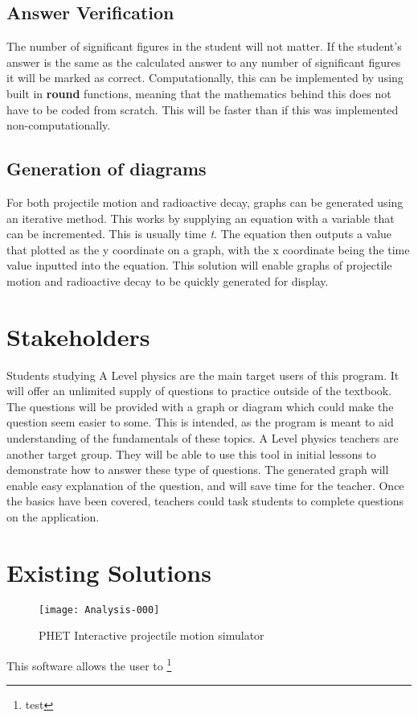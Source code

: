 \subsection{Answer Verification}
The number of significant figures in the student will not matter. If the student's answer is the same as the calculated answer to any number of significant figures it will be marked as correct. Computationally, this can be implemented by using built in \textbf{round} functions, meaning that the mathematics behind this does not have to be coded from scratch. This will be faster than if this was implemented non-computationally.
\subsection{Generation of diagrams}
For both projectile motion and radioactive decay, graphs can be generated using an iterative method. This works by supplying an equation with a variable that can be incremented. This is usually time \textit{t}. The equation then outputs a value that plotted as the y coordinate on a graph, with the x coordinate being the time value inputted into the equation. This solution will enable graphs of projectile motion and radioactive decay to be quickly generated for display.
\section{Stakeholders}
Students studying A Level physics are the main target users of this program. It will offer an unlimited supply of questions to practice outside of the textbook. The questions will be provided with a graph or diagram which could make the question seem easier to some. This is intended, as the program is meant to aid understanding of the fundamentals of these topics. 
A Level physics teachers are another target group. They will be able to use this tool in initial lessons to demonstrate how to answer these type of questions. The generated graph will enable easy explanation of the question, and will save time for the teacher. Once the basics have been covered, teachers could task students to complete questions on the application.
\clearpage
\section{Existing Solutions}
\begin{figure}[h]
	\centering
	\texttt{[image: Analysis-000]}
	\caption{PHET Interactive projectile motion simulator \protect{}}
\end{figure}
This software allows the user to
\footnote{test}
	